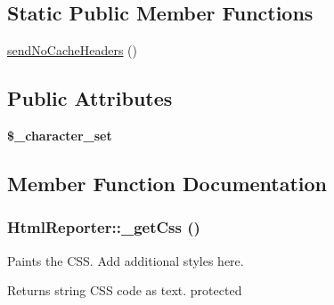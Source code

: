 \subsection*{Static Public Member Functions}
\begin{DoxyCompactItemize}
\item 
\hyperlink{class_html_reporter_a766ff4a9d0fea6de3734a6c9977fb63d}{sendNoCacheHeaders} ()
\end{DoxyCompactItemize}
\subsection*{Public Attributes}
\begin{DoxyCompactItemize}
\item 
\hypertarget{class_html_reporter_a4897748c674a311f3eb70af9ceca59f1}{
{\bfseries \$\_\-character\_\-set}}
\label{class_html_reporter_a4897748c674a311f3eb70af9ceca59f1}

\end{DoxyCompactItemize}


\subsection{Member Function Documentation}
\hypertarget{class_html_reporter_ad07ccfd2972eaa99fb57055f430ec498}{
\subsubsection[{\_\-getCss}]{\setlength{\rightskip}{0pt plus 5cm}HtmlReporter::\_\-getCss ()}}
\label{class_html_reporter_ad07ccfd2972eaa99fb57055f430ec498}
Paints the CSS. Add additional styles here. \begin{DoxyReturn}{Returns}
string CSS code as text.  protected 
\end{DoxyReturn}


